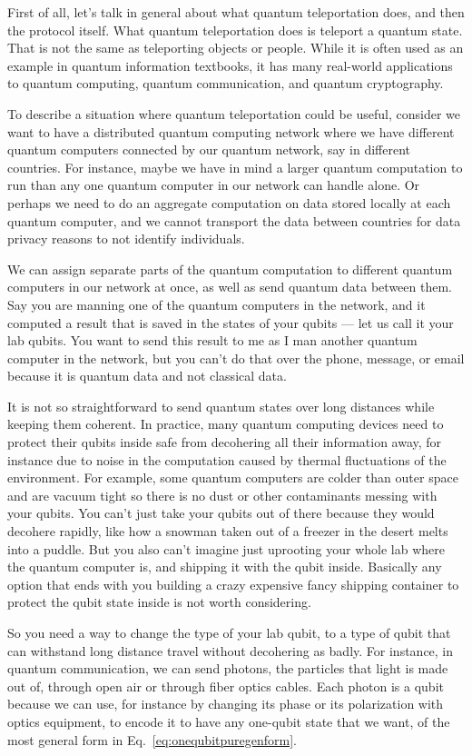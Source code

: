 \documentclass{article}
\theoremstyle{definition}
\begin{document}
First of all, let's talk in general about what quantum teleportation does, and then the protocol itself.
What quantum teleportation does is teleport a quantum state.  That is not the same as teleporting objects or people.
While it is often used as an example in quantum information textbooks, it has many real-world applications to quantum computing, quantum communication, and quantum cryptography.

To describe a situation where quantum teleportation could be useful, consider we want to have a distributed quantum computing network where we have different quantum computers connected by our quantum network, say in different countries.  For instance, maybe we have in mind a larger quantum computation to run than any one quantum computer in our network can handle alone.  Or perhaps we need to do an aggregate computation on data stored locally at each quantum computer, and we cannot transport the data between countries for data privacy reasons to not identify individuals.

We can assign separate parts of the quantum computation to different quantum computers in our network at once, as well as send quantum data between them.
Say you are manning one of the quantum computers in the network, and it computed a result that is saved in the states of your qubits --- let us call it your lab qubits.  You want to send this result to me as I man another quantum computer in the network, but you can't do that over the phone, message, or email because it is quantum data and not classical data.

It is not so straightforward to send quantum states over long distances while keeping them coherent.
In practice, many quantum computing devices need to protect their qubits inside safe from decohering all their information away, for instance due to noise in the computation caused by thermal fluctuations of the environment.  For example, some quantum computers are colder than outer space and are vacuum tight so there is no dust or other contaminants messing with your qubits.
You can't just take your qubits out of there because they would decohere rapidly, like how a snowman taken out of a freezer in the desert melts into a puddle.
But you also can't imagine just uprooting your whole lab where the quantum computer is, and shipping it with the qubit inside.  Basically any option that ends with you building a crazy expensive fancy shipping container to protect the qubit state inside is not worth considering.

So you need a way to change the type of your lab qubit, to a type of qubit that can withstand long distance travel without decohering as badly.
For instance, in quantum communication, we can send photons, the particles that light is made out of, through open air or through fiber optics cables.
Each photon is a qubit because we can use, for instance by changing its phase or its polarization with optics equipment, to encode it to have any one-qubit state that we want, of the most general form in Eq.~\eqref{eq:onequbitpuregenform}.
\end{document}
